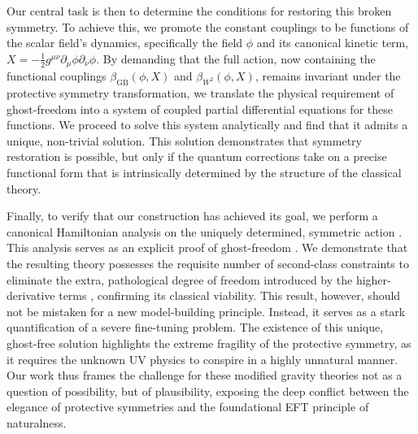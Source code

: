 \documentclass[twocolumn]{aastex631}
\begin{document}
Our central task is then to determine the conditions for restoring this broken symmetry. To achieve this, we promote the constant couplings to be functions of the scalar field's dynamics, specifically the field $\phi$ and its canonical kinetic term, $X = -\frac{1}{2}g^{\mu\nu}\partial_\mu\phi\partial_\nu\phi$. By demanding that the full action, now containing the functional couplings $\beta_{\text{GB}}(\phi, X)$ and $\beta_{W^2}(\phi, X)$, remains invariant under the protective symmetry transformation, we translate the physical requirement of ghost-freedom into a system of coupled partial differential equations for these functions. We proceed to solve this system analytically and find that it admits a unique, non-trivial solution. This solution demonstrates that symmetry restoration is possible, but only if the quantum corrections take on a precise functional form that is intrinsically determined by the structure of the classical theory.

Finally, to verify that our construction has achieved its goal, we perform a canonical Hamiltonian analysis on the uniquely determined, symmetric action \citep{molaee2021hamiltonianformalismghostfree,escalante2024hamiltoniananalysisperturbativelambda}. This analysis serves as an explicit proof of ghost-freedom \citep{molaee2021hamiltonianformalismghostfree,gomes2024pathologicalcharactermodificationscoincident}. We demonstrate that the resulting theory possesses the requisite number of second-class constraints to eliminate the extra, pathological degree of freedom introduced by the higher-derivative terms \citep{molaee2021hamiltonianformalismghostfree,escalante2024hamiltoniananalysisperturbativelambda}, confirming its classical viability. This result, however, should not be mistaken for a new model-building principle. Instead, it serves as a stark quantification of a severe fine-tuning problem. The existence of this unique, ghost-free solution highlights the extreme fragility of the protective symmetry, as it requires the unknown UV physics to conspire in a highly unnatural manner. Our work thus frames the challenge for these modified gravity theories not as a question of possibility, but of plausibility, exposing the deep conflict between the elegance of protective symmetries and the foundational EFT principle of naturalness.
\end{document}
